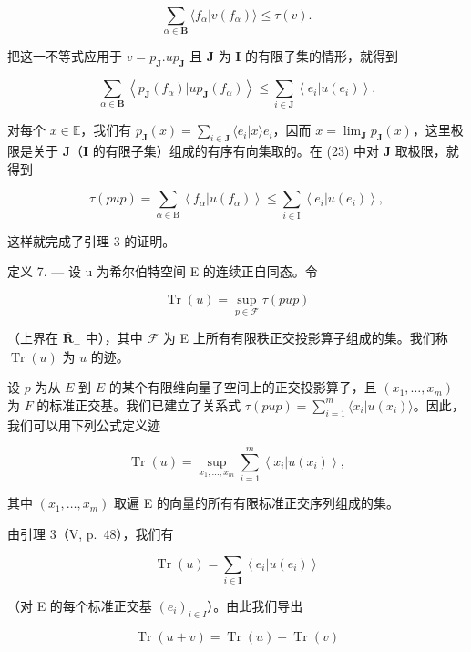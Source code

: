 \[
\sum_ {\alpha \in \mathbf {B}} \langle f _ {\alpha} | v (f _ {\alpha}) \rangle \leqslant \tau (v).
\]

把这一不等式应用于 \(v = p_{\mathbf{J}}.up_{\mathbf{J}}\) 且 \(\mathbf{J}\) 为 \(\mathbf{I}\) 的有限子集的情形，就得到

\[
\sum_ {\alpha \in \mathbf {B}} \left\langle p _ {\mathbf {J}} (f _ {\alpha}) | u p _ {\mathbf {J}} (f _ {\alpha}) \right\rangle \leqslant \sum_ {i \in \mathbf {J}} \left\langle e _ {i} | u (e _ {i}) \right\rangle .\tag{23}
\]

对每个 \(x \in \mathbb{E}\)，我们有 \(p_{\mathbf{J}}(x) = \sum_{i \in \mathbf{J}} \langle e_i | x \rangle e_i\)，因而 \(x = \lim_{\mathbf{J}} p_{\mathbf{J}}(x)\)，这里极限是关于 \(\mathbf{J}\)（\(\mathbf{I}\) 的有限子集）组成的有序有向集取的。在 (23) 中对 \(\mathbf{J}\) 取极限，就得到

\[
\tau (p u p) = \sum_ {\alpha \in \mathrm{B}} \left\langle f _ {\alpha} | u (f _ {\alpha}) \right\rangle \leqslant \sum_ {i \in \mathrm{I}} \left\langle e _ {i} | u (e _ {i}) \right\rangle ,
\]

这样就完成了引理 3 的证明。

定义 7. --- 设 u 为希尔伯特空间 E 的连续正自同态。令

\[
\operatorname{Tr} (u) = \sup _ {p \in \mathcal {F}} \tau (p u p)\tag{24}
\]

（上界在 \(\overline{\mathbf{R}}_+\) 中），其中 \(\mathcal{F}\) 为 E 上所有有限秩正交投影算子组成的集。我们称 \(\operatorname{Tr}(u)\) 为 \(u\) 的迹。

设 \(p\) 为从 \(E\) 到 \(E\) 的某个有限维向量子空间上的正交投影算子，且 \((x_1, \ldots, x_m)\) 为 \(F\) 的标准正交基。我们已建立了关系式 \(\tau(pup) = \sum_{i=1}^{m} \langle x_i | u(x_i) \rangle\)。因此，我们可以用下列公式定义迹

\[
\operatorname{Tr} (u) = \sup _ {x _ {1}, \dots , x _ {m}} \sum_ {i = 1} ^ {m} \left\langle x _ {i} | u (x _ {i}) \right\rangle ,\tag{24'}
\]

其中 \((x_{1},\dots,x_{m})\) 取遍 E 的向量的所有有限标准正交序列组成的集。

由引理 3（V, p.~48），我们有

\[
\operatorname{Tr} (u) = \sum_ {i \in \mathbf {I}} \left\langle e _ {i} | u (e _ {i}) \right\rangle\tag{25}
\]

（对 E 的每个标准正交基 \((e_{i})_{i\in I}\)）。由此我们导出

\[
\operatorname{Tr} (u + v) = \operatorname{Tr} (u) + \operatorname{Tr} (v)\tag{26}
\]

